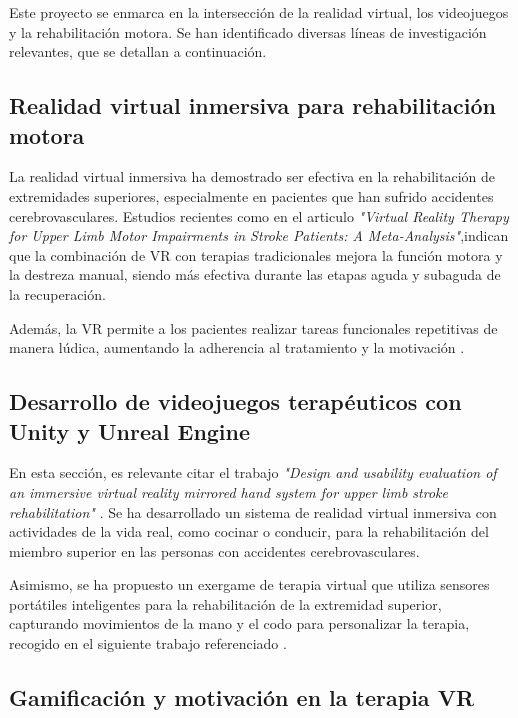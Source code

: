
Este proyecto se enmarca en la intersección de la realidad virtual, los videojuegos y la rehabilitación motora. Se han identificado diversas líneas de investigación relevantes, que se detallan a continuación.

\subsection{Realidad virtual inmersiva para rehabilitación motora}

La realidad virtual inmersiva ha demostrado ser efectiva en la rehabilitación de extremidades superiores, especialmente en pacientes que han sufrido accidentes cerebrovasculares. Estudios recientes como en el articulo \textit{"Virtual Reality Therapy for Upper Limb Motor Impairments in Stroke Patients: A Meta-Analysis"}\cite{vr_meta_stroke2024},indican que la combinación de VR con terapias tradicionales mejora la función motora y la destreza manual, siendo más efectiva durante las etapas aguda y subaguda de la recuperación.

Además, la VR permite a los pacientes realizar tareas funcionales repetitivas de manera lúdica, aumentando la adherencia al tratamiento y la motivación \cite{vr_upper_extremity2023}.

\subsection{Desarrollo de videojuegos terapéuticos con Unity y Unreal Engine}

En esta sección, es relevante citar el trabajo \textit{"Design and usability evaluation of an immersive virtual reality mirrored hand system for upper limb stroke rehabilitation" }\cite{mirrored_hand_system2025}. Se ha desarrollado un sistema de realidad virtual inmersiva con actividades de la vida real, como cocinar o conducir, para la rehabilitación del miembro superior en las personas con accidentes cerebrovasculares.

Asimismo, se ha propuesto un exergame de terapia virtual que utiliza sensores portátiles inteligentes para la rehabilitación de la extremidad superior, capturando movimientos de la mano y el codo para personalizar la terapia, recogido en el siguiente trabajo referenciado \cite{exergame_sensors2023}.

\subsection{Gamificación y motivación en la terapia VR}

